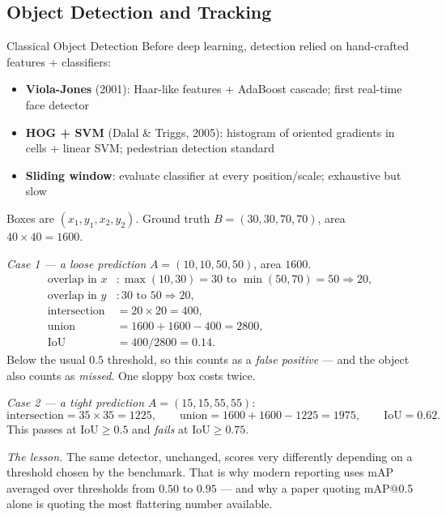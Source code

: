 \subsection{Object Detection and Tracking}

\begin{v3topic}{Classical Object Detection}
    Before deep learning, detection relied on hand-crafted features + classifiers:
    \begin{itemize}
        \item \textbf{Viola-Jones} (2001): Haar-like features + AdaBoost cascade; first real-time face detector
        \item \textbf{HOG + SVM} (Dalal \& Triggs, 2005): histogram of oriented gradients in cells + linear SVM; pedestrian detection standard
        \item \textbf{Sliding window}: evaluate classifier at every position/scale; exhaustive but slow
    \end{itemize}

\end{v3topic}
\begin{workedexample}
Boxes are $(x_1,y_1,x_2,y_2)$. Ground truth $B = (30,30,70,70)$, area
$40\times40 = 1600$.

\emph{Case 1 --- a loose prediction} $A = (10,10,50,50)$, area $1600$.
\[
\begin{aligned}
  \text{overlap in }x &: \max(10,30)=30 \text{ to } \min(50,70)=50
    \Rightarrow 20,\\
  \text{overlap in }y &: 30 \text{ to } 50 \Rightarrow 20,\\
  \text{intersection} &= 20\times20 = 400,\\
  \text{union} &= 1600 + 1600 - 400 = 2800,\\
  \mathrm{IoU} &= 400/2800 = \mathbf{0.14}.
\end{aligned}
\]
Below the usual $0.5$ threshold, so this counts as a \emph{false positive} ---
and the object also counts as \emph{missed}. One sloppy box costs twice.

\emph{Case 2 --- a tight prediction} $A = (15,15,55,55)$:
\[
  \text{intersection} = 35\times35 = 1225,\qquad
  \text{union} = 1600+1600-1225 = 1975,\qquad
  \mathrm{IoU} = \mathbf{0.62}.
\]
This passes at $\mathrm{IoU}\ge0.5$ and \emph{fails} at $\mathrm{IoU}\ge0.75$.

\emph{The lesson.} The same detector, unchanged, scores very differently
depending on a threshold chosen by the benchmark. That is why modern reporting
uses mAP averaged over thresholds from $0.50$ to $0.95$ --- and why a paper
quoting mAP@0.5 alone is quoting the most flattering number available.
\end{workedexample}

